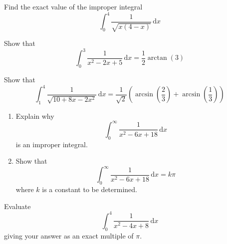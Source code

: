 \documentclass[leqno]{article}
\begin{document}
\djsFrontMatter
\begin{enumerate}[
  label=\textbf{\arabic*.},
  leftmargin=*,
  topsep=0pt,
  partopsep=0pt,
  parsep=0pt
]

\questionitem

Find the exact value of the improper integral
\[
\int_0^4 \frac{1}{\sqrt{x(4-x)}}\,\mathrm{d}x
\]

\newpage

\questionitem

Show that
\[
\int_{0}^{3} \frac{1}{x^2 - 2x + 5}\,\mathrm{d}x = \frac{1}{2}\arctan (3)
\]

\newpage

\questionitem

Show that
\[
\int_{1}^{4} \frac{1}{\sqrt{10 + 8x - 2x^2}}\,\mathrm{d}x = \frac{1}{\sqrt{2}}\left(\arcsin \left(\frac{2}{3}\right) + \arcsin \left(\frac{1}{3}\right)\right)
\]
\newpage
\questionitem

\begin{enumerate}[label=\textbf{(\alph*)}]
  \item Explain why
  \[
  \int_{0}^{\infty} \frac{1}{x^2 - 6x + 18} \, \mathrm{d}x
  \]
  is an improper integral.  \\
  \item Show that
  \[
  \int_{0}^{\infty} \frac{1}{x^2 - 6x + 18} \, \mathrm{d}x = k\pi
  \]
  where $k$ is a constant to be determined.  \\
\end{enumerate}

\newpage

\questionitem

Evaluate
\[
\int_{0}^{4} \frac{1}{x^2-4x+8}\, \mathrm{d}x
\]
giving your answer as an exact multiple of $\pi$. 


\newpage

\questionitem


\end{enumerate}
\end{document}
